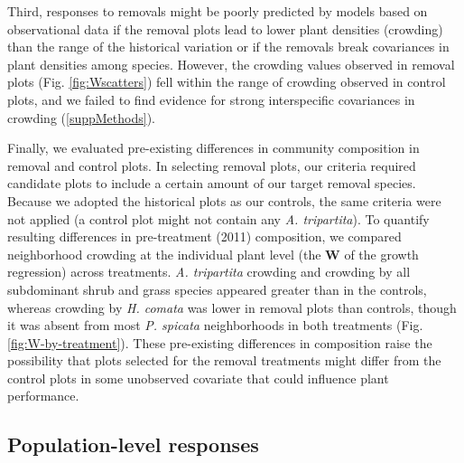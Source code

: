 \documentclass[11pt]{article}
\begin{document}
\begin{doublespacing}
Third, responses to removals might be poorly predicted by models based on observational data if the removal plots lead to lower plant densities (crowding) than the range of the historical variation or if the removals break covariances in plant densities among species. However, the crowding values observed in removal plots (Fig. \ref{fig:Wscatters}) fell within the range of crowding observed in control plots, and we failed to find evidence for strong interspecific covariances in crowding (\ref{suppMethods}).

Finally, we evaluated pre-existing differences in community composition in removal and control plots. In selecting removal plots, our criteria required candidate plots to include a certain amount of our target removal species. Because we adopted the historical plots as our controls, the same criteria were not applied (a control plot might not contain any \textit{A. tripartita}). To quantify resulting differences in pre-treatment (2011) composition, we compared neighborhood crowding at the individual plant level (the $\boldsymbol{W}$ of the growth regression) across treatments. \textit{A. tripartita} crowding and crowding by all subdominant shrub and grass species appeared greater than in the controls, whereas crowding by \textit{H. comata} was lower in removal plots than controls, though it was absent from most \textit{P. spicata} neighborhoods in both treatments (Fig. \ref{fig:W-by-treatment}). These pre-existing differences in composition raise the possibility that plots selected for the removal treatments might differ from the control plots in some unobserved covariate that could influence plant performance.

\subsection*{Population-level responses}


\end{doublespacing}
\end{document}
